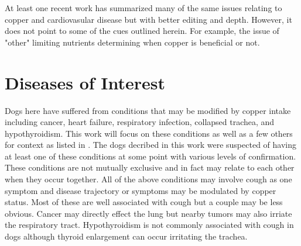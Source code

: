 
\mjmall

\mjmoverall



\mjmsulfur


\mjmwhy


At least one recent work 
\cite{Chen_Cai_Liang_Copper_homeostasis_copper_2023} has
summarized many of the same issues relating to copper
and cardiovasular disease but with better editing and depth.
However, it does not point to some of the cues outlined herein.
For example, the issue of "other" limiting nutrients determining
when copper is beneficial or not. 


\mjmworth


\section{  Diseases of Interest }

Dogs here have suffered from 
conditions that may be modified by copper intake including  
cancer, heart failure, respiratory infection, collapsed
trachea, and hypothyroidism. 
 This work will focus on these conditions as
well as a few others for context as listed in . 
The dogs decribed in this work were suspected of having
at least one of these conditions at some point with
various levels of confirmation. 
These conditions
are not mutually exclusive and in fact may relate to each
other when they occur together. 
All of the above conditions may involve cough as one symptom
and disease trajectory or symptoms may be modulated by
copper status. 
Most of these are well associated with cough but 
a couple may be less obvious. 
Cancer may directly effect the lung but nearby tumors
may also irriate the respiratory tract. 
Hypothyroidism is
not commonly associated with cough in dogs although
thyroid enlargement can occur irritating the trachea. 

